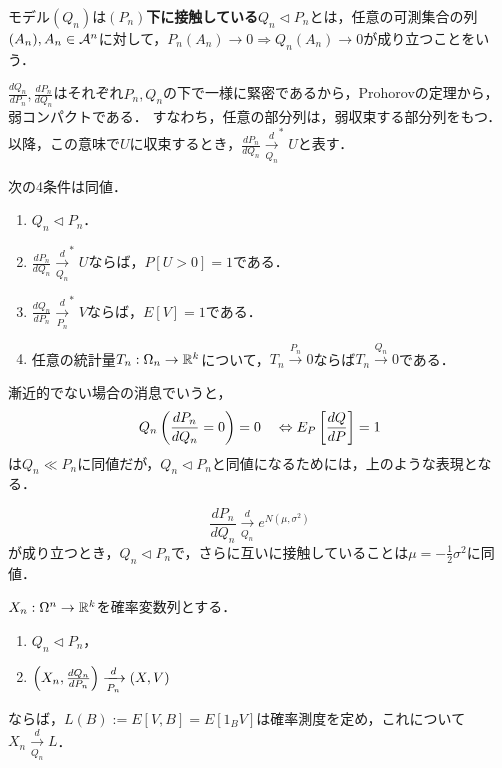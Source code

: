 \documentclass[uplatex,dvipdfmx]{jsreport}
\begin{document}
\begin{definition}[contiguous]
    モデル$(Q_n)$は\textbf{$(P_n)$下に接触している}$Q_n\triangleleft P_n$とは，任意の可測集合の列$(A_n),A_n\in\mathcal{A}^n$に対して，$P_n(A_n)\to0\Rightarrow Q_n(A_n)\to0$が成り立つことをいう．
\end{definition}

\begin{remark}
    $\frac{dQ_n}{dP_n},\frac{dP_n}{dQ_n}$はそれぞれ$P_n,Q_n$の下で一様に緊密であるから，Prohorovの定理から，弱コンパクトである．
    すなわち，任意の部分列は，弱収束する部分列をもつ．
    以降，この意味で$U$に収束するとき，$\frac{dP_n}{dQ_n}\xrightarrow[Q_n]{d}^*U$と表す．
\end{remark}

\begin{lemma}
    次の4条件は同値．
    \begin{enumerate}
        \item $Q_n\triangleleft P_n$．
        \item $\frac{dP_n}{dQ_n}\xrightarrow[Q_n]{d}^*U$ならば，$P[U>0]=1$である．
        \item $\frac{dQ_n}{dP_n}\xrightarrow[P_n]{d}^*V$ならば，$E[V]=1$である．
        \item 任意の統計量$T_n:\Omega_n\to\mathbb{R}^k$について，$T_n\xrightarrow{P_n}0$ならば$T_n\xrightarrow{Q_n}0$である．
    \end{enumerate}
\end{lemma}
\begin{remarks}
    漸近的でない場合の消息でいうと，
    \[Q_n\left(\frac{dP_n}{dQ_n}=0\right)=0\quad\Leftrightarrow E_P\left[\frac{dQ}{dP}\right]=1\]
    は$Q_n\ll P_n$に同値だが，$Q_n\triangleleft P_n$と同値になるためには，上のような表現となる．
\end{remarks}

\begin{example}[漸近的対数正規性]
    \[\frac{dP_n}{dQ_n}\xrightarrow[Q_n]{d}e^{N(\mu,\sigma^2)}\]
    が成り立つとき，$Q_n\triangleleft P_n$で，さらに互いに接触していることは$\mu=-\frac{1}{2}\sigma^2$に同値．
\end{example}

\begin{theorem}
    $X_n:\Omega^n\to\mathbb{R}^k$を確率変数列とする．
    \begin{enumerate}
        \item $Q_n\triangleleft P_n$，
        \item $\left(X_n,\frac{dQ_n}{dP_n}\right)\xrightarrow[P_n]{d}(X,V)$
    \end{enumerate}
    ならば，$L(B):=E[V,B]=E[1_BV]$は確率測度を定め，これについて$X_n\xrightarrow[Q_n]{d}L$．
\end{theorem}
\end{document}

